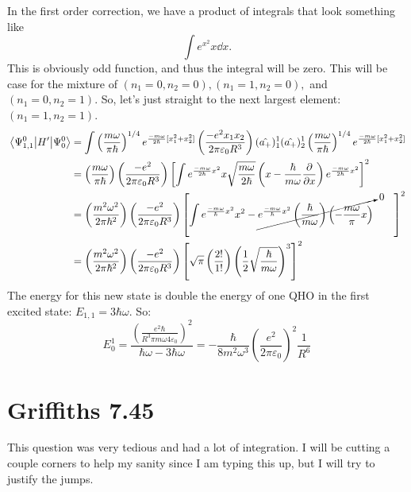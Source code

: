\documentclass[11pt]{article}
\begin{document}
\begin{enumerate}[label=\alph*)]
In the first order correction, we have a product of integrals that look something like
\[\int e^{x^2}x \dd{x}.\]
This is obviously odd function, and thus the integral will be zero. This will be case for the mixture of $(n_1 = 0, n_2 =0), (n_1 =1, n_2 = 0), $ and $(n_1 = 0, n_2 = 1)$. So, let's just straight to the next largest element: $(n_1 = 1, n_2=1)$.
\begin{align*}
\mel{\Psi_{1,1}^0}{H^\prime}{\Psi_0^0} & = \int \left(\frac{m\omega}{\pi \hbar}\right)^{1/4} e^{\frac{-m\omega}{2\hbar}[x_1^2 + x_2^2]} \left(\frac{-e^2x_1x_2}{2\pi\varepsilon_0 R^3}\right)(\hat{a_+})_1^{1}(\hat{a_+})_2^{1}\left(\frac{m\omega}{\pi \hbar}\right)^{1/4} e^{\frac{-m\omega}{2\hbar}[x_1^2 + x_2^2]}\\
& = \left(\frac{m\omega}{\pi \hbar}\right)\left(\frac{-e^2}{2\pi\varepsilon_0 R^3}\right)\left[\int e^{\frac{-m\omega}{2\hbar}x^2}x\sqrt{\frac{m\omega}{2\hbar}}\left(x -\frac{\hbar}{m\omega}\pdv{x}\right)e^{\frac{-m\omega}{2\hbar}x^2}\right]^2\\
& = \left(\frac{m^2\omega^2}{2\pi \hbar^2}\right)\left(\frac{-e^2}{2\pi\varepsilon_0 R^3}\right)\left[\int e^{\frac{-m\omega}{\hbar}x^2}x^2 - \cancelto{0}{e^{\frac{-m\omega}{\hbar}x^2}\left(\frac{\hbar}{m\omega}\right)\left(-\frac{m\omega}{\pi}x\right)}\qquad \right]^2\\
& = \left(\frac{m^2\omega^2}{2\pi \hbar^2}\right)\left(\frac{-e^2}{2\pi\varepsilon_0 R^3}\right)\left[\sqrt{\pi}\left(\frac{2!}{1!}\right)\left(\frac{1}{2}\sqrt{\frac{\hbar}{m\omega}}\right)^3\right]^2\\
\end{align*}
The energy for this new state is double the energy of one QHO in the first excited state: $E_{1,1} = 3\hbar \omega$. So:
\[E_0^1 = \frac{\left(\frac{e^2\hbar}{R^3 \pi m\omega 4 \varepsilon_0}\right)^2}{\hbar \omega - 3\hbar \omega}\boxed{= -\frac{\hbar}{8m^2\omega^3}\left(\frac{e^2}{2\pi\varepsilon_0}\right)^2\frac{1}{R^6}}\]
\end{enumerate}


\newpage

\section*{Griffiths 7.45}

This question was very tedious and had a lot of integration. I will be cutting a couple corners to help my sanity since I am typing this up, but I will try to justify the jumps.
\end{document}
